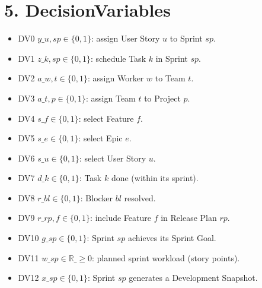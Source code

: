 \documentclass[11pt]{article}
\begin{document}
\section{5. DecisionVariables}
\begin{itemize}[leftmargin=2em]
  \item DV0 $y\_{u,sp}\in\{0,1\}$: assign User Story $u$ to Sprint $sp$.
  \item DV1 $z\_{k,sp}\in\{0,1\}$: schedule Task $k$ in Sprint $sp$.
  \item DV2 $a\_{w,t}\in\{0,1\}$: assign Worker $w$ to Team $t$.
  \item DV3 $a\_{t,p}\in\{0,1\}$: assign Team $t$ to Project $p$.
  \item DV4 $s\_f\in\{0,1\}$: select Feature $f$.
  \item DV5 $s\_e\in\{0,1\}$: select Epic $e$.
  \item DV6 $s\_u\in\{0,1\}$: select User Story $u$.
  \item DV7 $d\_k\in\{0,1\}$: Task $k$ done (within its sprint).
  \item DV8 $r\_{bl}\in\{0,1\}$: Blocker $bl$ resolved.
  \item DV9 $r\_{rp,f}\in\{0,1\}$: include Feature $f$ in Release Plan $rp$.
  \item DV10 $g\_{sp}\in\{0,1\}$: Sprint $sp$ achieves its Sprint Goal.
  \item DV11 $w\_{sp}\in\mathbb{R}\_{\ge 0}$: planned sprint workload (story points).
  \item DV12 $x\_{sp}\in\{0,1\}$: Sprint $sp$ generates a Development Snapshot.
\end{itemize}
\end{document}
